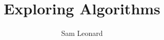 \documentclass[12pt, a4paper]{third-rep}
\title{Exploring \glsentrylong{pake} Algorithms}
\author{Sam Leonard}
\begin{document}
\dotitleandabstract

\tableofcontents







\printnoidxglossaries{}

             

       
                                
                                
% 
\end{document}
